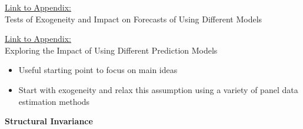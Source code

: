 \documentclass[static]{JJH-Beamer}
\begin{document}
\clearpage

\begin{frame}

\hypertarget{ret:tarttarttart}{}
\begin{center}
\hyperlink{tarttarttart}{\underline{Link to Appendix:}}\\
\vspace{1.5mm}
Tests of Exogeneity and Impact on Forecasts of Using Different Models
\end{center}

\hypertarget{ret:candycane}{}
\begin{center}
\hyperlink{candycane}{\underline{Link to Appendix:}}\\
Exploring the Impact of Using Different Prediction Models
\end{center}

\end{frame}

\clearpage

\begin{itemize}
\item Useful starting point to focus on main ideas
\item Start with exogeneity and relax this assumption using a variety of panel data estimation methods
\end{itemize}

\clearpage

\begin{frame}

\begin{center}
\textbf{Structural Invariance}
\end{center}

\end{frame}
\end{document}
